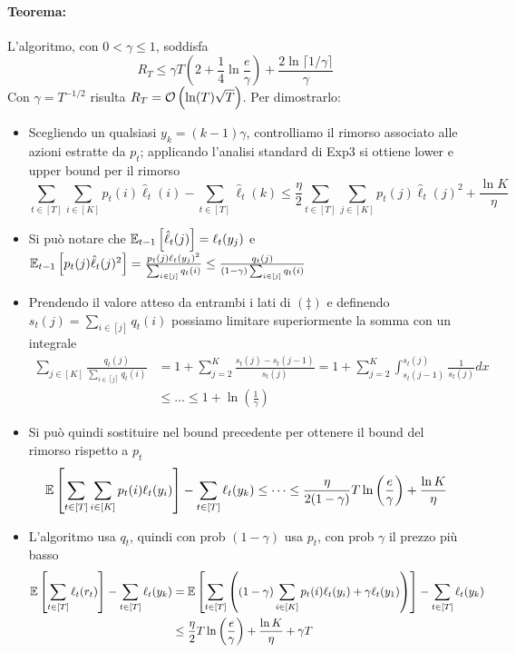 \paragraph{Teorema:} L'algoritmo, con $0 < \gamma \leq 1$, soddisfa
$$ R_T \leq \gamma T \left(2 + \frac{1}{4} \ln \frac{e}{\gamma}\right) + \frac{2 \ln \lceil 1/\gamma \rceil}{\gamma} $$
Con $\gamma = T^{-1/2}$ risulta $R_T = \mathcal{O} \left(\ln (T) \sqrt{T}\right)$. Per dimostrarlo:
\begin{itemize}
    \item Scegliendo un qualsiasi $y_k = (k-1) \gamma$, controlliamo il rimorso associato alle azioni estratte da $p_t$; applicando l'analisi standard di Exp3 si ottiene lower e upper bound per il rimorso
    \[\sum_{t \in [T]} \sum_{i \in [K]} p_t (i) \hat \ell_t (i) - \sum_{t \in [T]} \hat \ell_t (k) \leq \frac{\eta}{2} \sum_{t \in [T]} \sum_{j \in [K]} p_t(j) \hat \ell_t(j)^2 + \frac{\ln K}{\eta} \tag{\ddag}\]

    \item Si può notare che $\mathbb{E}_{t-1} \left[\hat \ell_t (j)\right] = \ell_t (y_j)$ e $\mathbb{E}_{t-1} \left[p_t (j) \hat \ell_t (j)^2 \right] = \frac{p_t (j) \ell_t (y_j)^2}{\sum_{i \in [j]} q_t (i)} \leq \frac{q_t(j)}{(1 - \gamma) \sum_{i \in [j]} q_t (i)}$

    \item Prendendo il valore atteso da entrambi i lati di $(\ddag)$ e definendo $s_t(j) = \sum_{i \in [j]} q_t (i)$ possiamo limitare superiormente la somma con un integrale
    \begin{align*}
        \sum_{j \in [K]} \frac{q_t(j)}{\sum_{i \in [j]}q_t(i)} & = 1 + \sum_{j = 2}^K \frac{s_t (j) - s_t (j-1)}{s_t (j)} = 1 + \sum_{j = 2}^K \int_{s_t(j-1)}^{s_t(j)} \frac{1}{s_t (j)} dx \\
        & \leq \dots \leq 1 + \ln \left(\frac{1}{\gamma}\right)
    \end{align*}

    \item Si può quindi sostituire nel bound precedente per ottenere il bound del rimorso rispetto a $p_t$
    $$ \mathbb{E} \left[\sum_{t \in [T]} \sum_{i \in [K]} p_t (i) \ell_t (y_i) \right] - \sum_{t \in [T]} \ell_t (y_k) \leq \dots \leq \frac{\eta}{2 (1 - \gamma)} T \ln \left(\frac{e}{\gamma}\right) + \frac{\ln K}{\eta} $$

    \item L'algoritmo usa $q_t$, quindi con prob $(1 - \gamma)$ usa $p_t$, con prob $\gamma$ il prezzo più basso
    \begin{align*}
        \mathbb{E} \left[\sum_{t \in [T]} \ell_t (r_t) \right] - \sum_{t \in [T]} \ell_t (y_k) & = \mathbb{E} \left[\sum_{t \in [T]} \left((1-\gamma) \sum_{i \in [K]} p_t (i) \ell_t (y_i) + \gamma \ell_t (y_1) \right)\right] - \sum_{t \in [T]} \ell_t (y_k) \\
        & \leq \frac{\eta}{2} T \ln \left(\frac{e}{\gamma}\right) + \frac{\ln K}{\eta} + \gamma T
    \end{align*}


\end{itemize}
